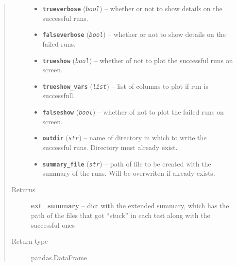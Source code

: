 \documentclass[a4paper,10pt,oneside]{sphinxmanual}
\begin{document}
\begin{fulllineitems}
\begin{quote}
\begin{description}
\begin{itemize}
\item {} 
\textbf{\texttt{trueverbose}} (\emph{\texttt{bool}}) -- whether or not to show details on the successful runs.

\item {} 
\textbf{\texttt{falseverbose}} (\emph{\texttt{bool}}) -- whether or not to show details on the failed runs.

\item {} 
\textbf{\texttt{trueshow}} (\emph{\texttt{bool}}) -- whether of not to plot the successful runs on screen.

\item {} 
\textbf{\texttt{trueshow\_vars}} (\emph{\texttt{list}}) -- list of columns to plot if run is successfull.

\item {} 
\textbf{\texttt{falseshow}} (\emph{\texttt{bool}}) -- whether of not to plot the failed runs on screen.

\item {} 
\textbf{\texttt{outdir}} (\emph{\texttt{str}}) -- name of directory in which to write the successful runs. Directory must already exist.

\item {} 
\textbf{\texttt{summary\_file}} (\emph{\texttt{str}}) -- path of file to be created with the summary of the runs. Will be overwriten if already exists.

\end{itemize}

\item[{Returns}] \leavevmode
\textbf{ext\_summary} -- dict with the extended summary, which has the path of the files that got ``stuck'' in each test along with the successful ones

\item[{Return type}] \leavevmode
pandas.DataFrame

\end{description}\end{quote}

\end{fulllineitems}

\end{document}
